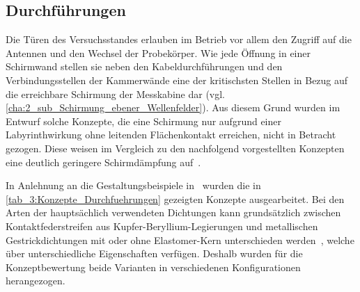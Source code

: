



\subsection{Durchführungen}\label{cha:3_sub_Durchfuehrungen}

Die Türen des Versuchsstandes erlauben im Betrieb vor allem den Zugriff auf die Antennen und den Wechsel der Probekörper. Wie jede Öffnung in einer Schirmwand stellen sie neben den Kabeldurchführungen und den Verbindungsstellen der Kammerwände eine der kritischsten Stellen in Bezug auf die erreichbare Schirmung der Messkabine dar (vgl. \Abschnitt\ref{cha:2_sub_Schirmung_ebener_Wellenfelder}). Aus diesem Grund wurden im Entwurf solche Konzepte, die eine Schirmung nur aufgrund einer Labyrinthwirkung ohne leitenden Flächenkontakt erreichen, nicht in Betracht gezogen. Diese weisen im Vergleich zu den nachfolgend vorgestellten Konzepten eine deutlich geringere Schirmdämpfung auf~\cite{Design_of_shielded_enclosures}.
\par
\vspace{\linespace}
In Anlehnung an die Gestaltungsbeispiele in~\cite{EM_Schirmung, Design_of_shielded_enclosures} wurden die in \Tabelle\ref{tab_3:Konzepte_Durchfuehrungen} gezeigten Konzepte ausgearbeitet. Bei den Arten der hauptsächlich verwendeten Dichtungen kann grundsätzlich zwischen Kontaktfederstreifen aus Kupfer-Beryllium-Legierungen und metallischen Gestrickdichtungen mit oder ohne Elastomer-Kern unterschieden werden~\cite{EM_Schirmung}, welche über unterschiedliche Eigenschaften verfügen. Deshalb wurden für die Konzeptbewertung beide Varianten in verschiedenen Konfigurationen herangezogen.



